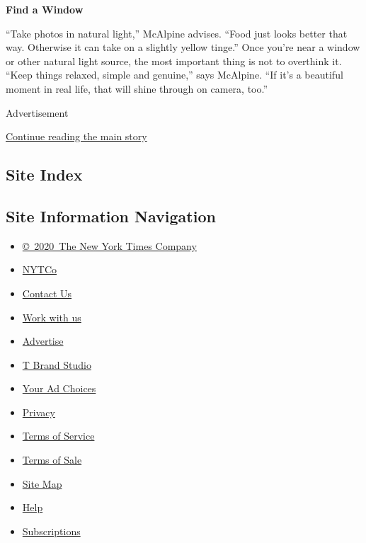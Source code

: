 \textbf{Find a Window}

``Take photos in natural light,'' McAlpine advises. ``Food just looks
better that way. Otherwise it can take on a slightly yellow tinge.''
Once you're near a window or other natural light source, the most
important thing is not to overthink it. ``Keep things relaxed, simple
and genuine,'' says McAlpine. ``If it's a beautiful moment in real life,
that will shine through on camera, too.''

Advertisement

\protect\hyperlink{after-bottom}{Continue reading the main story}

\hypertarget{site-index}{%
\subsection{Site Index}\label{site-index}}

\hypertarget{site-information-navigation}{%
\subsection{Site Information
Navigation}\label{site-information-navigation}}

\begin{itemize}
\tightlist
\item
  \href{https://help.nytimes.com/hc/en-us/articles/115014792127-Copyright-notice}{©~2020~The
  New York Times Company}
\end{itemize}

\begin{itemize}
\tightlist
\item
  \href{https://www.nytco.com/}{NYTCo}
\item
  \href{https://help.nytimes.com/hc/en-us/articles/115015385887-Contact-Us}{Contact
  Us}
\item
  \href{https://www.nytco.com/careers/}{Work with us}
\item
  \href{https://nytmediakit.com/}{Advertise}
\item
  \href{http://www.tbrandstudio.com/}{T Brand Studio}
\item
  \href{https://www.nytimes.com/privacy/cookie-policy\#how-do-i-manage-trackers}{Your
  Ad Choices}
\item
  \href{https://www.nytimes.com/privacy}{Privacy}
\item
  \href{https://help.nytimes.com/hc/en-us/articles/115014893428-Terms-of-service}{Terms
  of Service}
\item
  \href{https://help.nytimes.com/hc/en-us/articles/115014893968-Terms-of-sale}{Terms
  of Sale}
\item
  \href{https://spiderbites.nytimes.com}{Site Map}
\item
  \href{https://help.nytimes.com/hc/en-us}{Help}
\item
  \href{https://www.nytimes.com/subscription?campaignId=37WXW}{Subscriptions}
\end{itemize}
